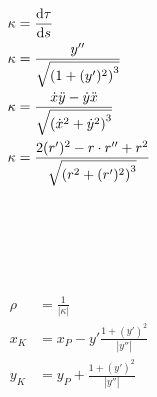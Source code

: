 \begin{boxleft}
\end{boxleft}\begin{boxrightshaded}
\begin{align} 
\kappa&=\frac{\mathop{}\!\mathrm{d} \tau}{\mathop{}\!\mathrm{d} s}\\
\kappa&=\frac{y''}{\sqrt{\left(1+(y')^2\right)^3}}\\
\kappa&=\frac{\dot{x}\ddot{y}-\dot{y}\ddot{x}}{\sqrt{\left(\dot{x}^2+\dot{y}^2\right)^3}}\\
\kappa&=\frac{2(r')^2-r\cdot r''+r^2}{\sqrt{\left(r^2+(r')^2\right)^3}}
\end{align}\end{boxrightshaded}

\begin{boxleft}
\\
\\
\\
\\
\end{boxleft}\begin{boxrightshaded}
\begin{align} 
\rho&=\frac{1}{|\kappa|}\\
x_K&=x_P-y'\frac{1+(y')^2}{|y''|}\\
y_K&=y_P+\frac{1+(y')^2}{|y''|}
\end{align}\end{boxrightshaded}




